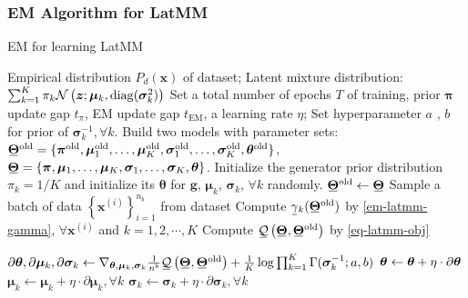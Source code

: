 \subsubsection{EM Algorithm for LatMM}
\begin{algorithm}[t]
  \caption{EM for learning LatMM}\label{flow-algo-sem}
  \begin{algorithmic}[1]
     Empirical distribution $P_d(\bm{x})$ of dataset;
    \STATE Latent mixture distribution: 
    \STATE $\sum_{k=1}^{K}\pi_k \mathcal{N}\left(\bm{z}; \bm{\mu}_k, \mathrm{diag}(\bm{\sigma}_k^2)\right)$
    \STATE Set a total number of epochs $T$ of training, prior $\bm{\pi}$ update gap $t_{\pi}$, EM update gap $t_{\mathrm{EM}}$, a learning rate $\eta$; Set hyperparameter $a$ , $b$ for prior of
    $\bm{\sigma}_k^{-1}, \forall k$.
    \STATE Build two models with parameter sets:
    \STATE $\ubar{\bm{\Theta}}^{\mathrm{old}}=\{ \bm{\pi}^{\mathrm{old}},
    \bm{\mu}_1^{\mathrm{old}},\hdots, \bm{\mu}_K^{\mathrm{old}}, \bm{\sigma}_1^{\mathrm{old}},\hdots,
    \bm{\sigma}_K^{\mathrm{old}}, \bm{\theta}^{\mathrm{old}} \}$,
    \STATE $\ubar{\bm{\Theta}} = \{ \bm{\pi},
    \bm{\mu}_1,\hdots, \bm{\mu}_K, \bm{\sigma}_1,\hdots,
    \bm{\sigma}_K, \bm{\theta} \}$.
    \STATE Initialize the generator prior distribution $\pi_k = 1/K$ and initialize its $\bm{\theta}$ for $\bm{g}$, $\bm{\mu}_k$, $\bm{\sigma}_k$, $\forall k$ randomly.
    \STATE $\ubar{\bm{\Theta}}^{\mathrm{old}} \gets \ubar{\bm{\Theta}}$
    \STATE Sample a batch of data $\left\{ \bm{x}^{(i)}
    \right\}_{i=1}^{n_b}$ from dataset
    \STATE Compute $\ubar{\gamma}_k(\ubar{\bm{\Theta}}^{\mathrm{old}})$ by \ref{em-latmm-gamma}, $\forall \bm{x}^{(i)}$ and $k=1, 2, \cdots, K$ %
    \STATE Compute
    $\ubar{\Qq}\left(\ubar{\bm{\Theta}},\ubar{\bm{\Theta}}^{\mathrm{old}}\right)$ by \ref{eq-latmm-obj}%

    \STATE $\partial{\bm{\th}}, \partial{\bm{\mu}_k}, \partial{\bm{\sigma}_k}\gets 
    \nabla_{\bm{\theta}, \bm{\mu}_k, \bm{\sigma}_k} 
    \frac{1}{n^{b}}\ubar{\Qq}\left(\ubar{\bm{\Theta}},\ubar{\bm{\Theta}}^{\mathrm{old}}\right)
    +\frac{1}{K}
    \log\prod_{k=1}^K
    \Gamma(\bm{\sigma}_k^{-1};
    a, b)$ %
    \STATE $\bm{\theta} \gets \bm{\theta} + \eta \cdot \partial{\bm{\theta}}$
    \STATE $\bm{\mu}_k \gets \bm{\mu}_k + \eta \cdot \partial{\bm{\mu}_k}, \forall k$
    \STATE $\bm{\sigma}_k \gets \bm{\sigma}_k + \eta \cdot \partial{\bm{\sigma}_k},
    \forall k$
    \ENDFOR


\end{algorithmic}
\end{algorithm}
